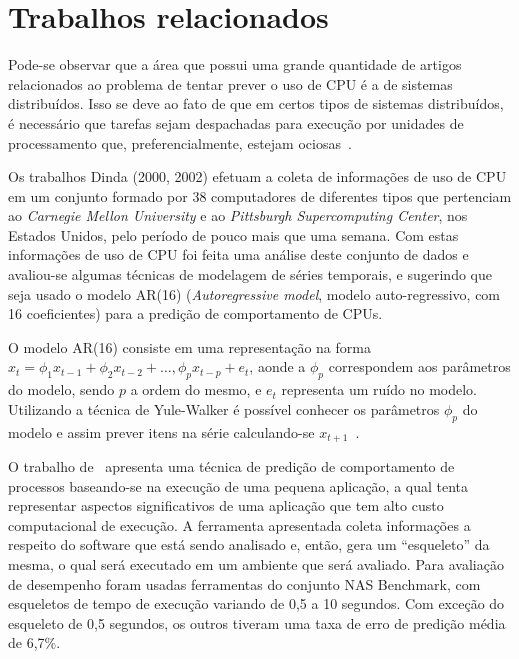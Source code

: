 %
%
\chapter{Trabalhos relacionados}

Pode-se observar que a área que possui uma grande quantidade de artigos
relacionados ao problema de tentar prever o uso de CPU é a de sistemas
distribuídos. Isso se deve ao fato de que em certos tipos de sistemas
distribuídos, é necessário que tarefas sejam despachadas para execução por
unidades de processamento que, preferencialmente, estejam ociosas~\cite{zhang2007cpu}.

Os trabalhos Dinda (2000, 2002)\nocite{dinda2000host}
\nocite{dinda2002evaluation} efetuam a coleta de informações de uso de
CPU em um conjunto formado por 38 computadores de diferentes tipos que
pertenciam ao \emph{Carnegie Mellon University} e ao \emph{Pittsburgh
Supercomputing Center}, nos Estados Unidos, pelo período de pouco mais que uma
semana. Com estas informações de uso de CPU foi feita uma análise deste conjunto
de dados e avaliou-se algumas técnicas de modelagem de séries temporais, e
sugerindo que seja usado o modelo AR(16) (\emph{Autoregressive model},
modelo auto-regressivo, com 16 coeficientes) para a predição de comportamento
de CPUs.

O modelo AR(16) consiste em uma representação na forma
$x_t = \phi_{1}x_{t-1} + \phi_{2}x_{t-2}+\dotsc,\phi_{p}x_{t-p}+e_t$, aonde a
$\phi_p$ correspondem aos parâmetros do modelo, sendo $p$ a ordem do mesmo, e
$e_t$ representa um ruído no modelo. Utilizando a técnica de Yule-Walker é
possível conhecer os parâmetros $\phi_p$ do modelo e assim prever itens na
série calculando-se $x_{t+1}$~\cite{baddour2005autoregressive}.

O trabalho de~ apresenta uma técnica de
predição de comportamento de processos baseando-se na execução de uma pequena
aplicação, a qual tenta representar aspectos significativos de uma aplicação que
tem alto custo computacional de execução. A ferramenta apresentada coleta
informações a respeito do software que está sendo analisado e, então, gera um
“esqueleto” da mesma, o qual será executado em um ambiente que será
avaliado. Para avaliação de desempenho foram usadas ferramentas do conjunto NAS
Benchmark, com esqueletos de tempo de execução variando de 0,5 a 10 segundos.
Com exceção do esqueleto de 0,5 segundos, os outros tiveram uma taxa de erro de
predição média de 6,7\%. 

